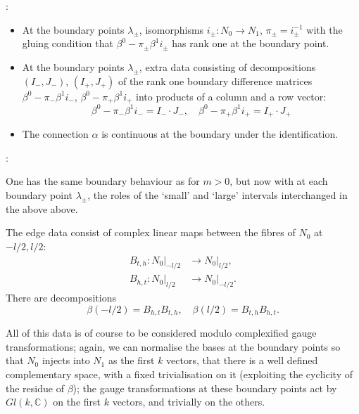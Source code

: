 \documentclass[12pt]{article}
\theoremstyle{definition}
\theoremstyle{remark}
\numberwithin{theorem}{section}
\begin{document}
\bigskip

:
 \medskip
 
 \begin{itemize}
 \item At the boundary points $\lambda_\pm$, isomorphisms
$i_\pm\colon N_{ 0}\rightarrow N_1$, $\pi_\pm= i_\pm^{-1}$
with the gluing condition that
$\beta^{0}-\pi_\pm\beta^{1}i_\pm$ has rank one at the boundary point.

\item At the boundary points $\lambda_\pm$, extra data consisting of decompositions $ (I_-, J_-)$, $  (I_+,J_+)$ of the rank one boundary difference matrices  $\beta^{ 0}-\pi_-\beta^{1}i_-$, $\beta^{0}-\pi_+\beta^{1}i_+$ into products of a column and a row vector:
\begin{equation}
\beta^{0}-\pi_-\beta^{1}i_-= I_-\cdot J_-,\quad \beta^{0}-\pi_+\beta^{1}i_+ = I_+\cdot J_+\end{equation}
\item The connection $\alpha$ is continuous at the boundary under the identification.
\end{itemize}

\bigskip

:
 \medskip
 
  One has the same boundary behaviour as for $m>0$, but now with at each boundary point $\lambda_\pm$, the roles of the `small' and `large' intervals interchanged in the above above.

\bigskip

\medskip

The edge data consist of complex linear maps between the fibres of $N_0$ at $-l/2, l/2$:
\begin{align} 
B_{t,h} : N_0|_{-l/2} & \rightarrow N_0|_{l/2},\\ 
B_{h,t}: N_0|_{l/2} & \rightarrow N_0|_{-l/2}.
\end{align}
There are decompositions
\begin{equation}
\beta(-l/2) = B_{h,t}B_{t,h},\quad \beta( l/2) = B_{t,h}B_{h,t}.
\end{equation}

 All of this data is of course to be considered modulo complexified  gauge transformations; again, we can normalise the bases at the boundary points so that $N_0$ injects into $N_1$ as the first $k$ vectors, that there is a well defined complementary space, with a fixed trivialisation on it (exploiting the cyclicity of the residue of $\beta$); the gauge transformations at these boundary points act by $Gl(k,\mathbb{C})$ on the first $k$ vectors, and trivially on the others. 
 
\end{document}

